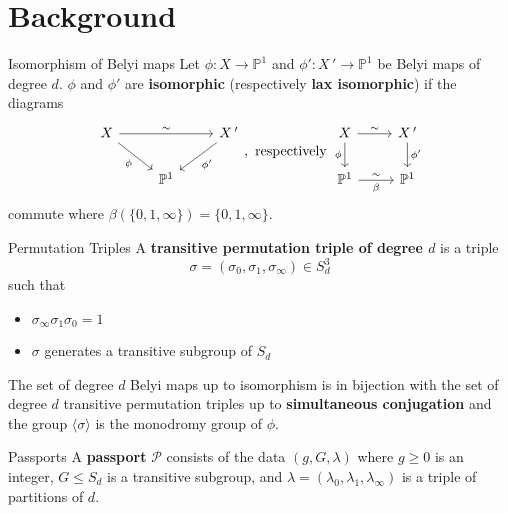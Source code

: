 \documentclass[xcolor=dvipsnames]{beamer}
\theoremstyle{plain}
\newcommand{\PP}{\mathbb P}
\begin{document}
  \section{Background}{
    \begin{frame}[fragile]{Isomorphism of Belyi maps}
      Let $\phi\colon X\to\PP^1$
      and
      $\phi'\colon X\,'\to\PP^1$
      be Belyi maps of degree $d$.
      \pause\newline
      $\phi$ and $\phi'$ are
      \textbf{isomorphic}
      (respectively \textbf{lax isomorphic})
      if the diagrams
      \[
        \begin{tikzcd}
          X\arrow{rr}{\sim}\arrow{dr}[swap]{\phi}
          &
          &X\,'\arrow{dl}{\phi'}\\
          &\PP^1
        \end{tikzcd},
        \text{ respectively }
        \begin{tikzcd}
          X\arrow{r}{\sim}\arrow{d}[swap]{\phi}&X\,'\arrow{d}{\phi'}\\
          \PP^1\arrow{r}{\sim}[swap]{\beta}&\PP^1
        \end{tikzcd}
      \]
      commute
      where $\beta(\{0,1,\infty\}) = \{0,1,\infty\}$.
    \end{frame}
    \begin{frame}{Permutation Triples}
      A \textbf{transitive permutation triple of degree $d$} is a triple
      \[
        \sigma = (\sigma_0, \sigma_1, \sigma_\infty)\in S_d^3
      \]
      such that
      \begin{itemize}
        \item
          $\sigma_\infty\sigma_1\sigma_0=1$
        \item
          $\sigma$ generates a transitive subgroup of $S_d$
      \end{itemize}
      \pause
      The set of degree $d$ Belyi maps up to isomorphism is in bijection with the
      set of degree $d$ transitive permutation triples up to
      \textbf{simultaneous conjugation} and
      the group $\langle\sigma\rangle$ is the monodromy group of $\phi$.
    \end{frame}
    \begin{frame}{Passports}
      A \textbf{passport} $\mathcal{P}$ consists of the data
      $(g,G,\lambda)$ where $g\geq 0$ is an integer,
      $G\leq S_d$ is a transitive subgroup,
      and $\lambda = (\lambda_0,\lambda_1,\lambda_\infty)$
      is a triple of partitions of $d$.
      \pause
      \par

\end{frame}}
\end{document}
